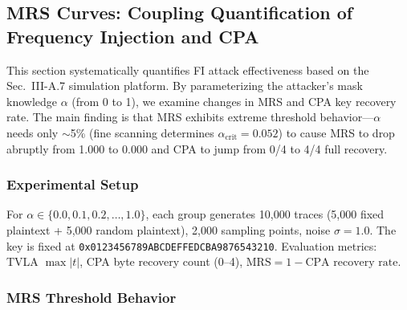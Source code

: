 \documentclass[journal]{IEEEtran}
\begin{document}
\subsection{MRS Curves: Coupling Quantification of Frequency Injection and CPA}

This section systematically quantifies FI attack effectiveness based on the Sec.~III-A.7 simulation platform. By parameterizing the attacker's mask knowledge $\alpha$ (from 0 to 1), we examine changes in MRS and CPA key recovery rate. The main finding is that MRS exhibits extreme threshold behavior---$\alpha$ needs only $\sim$5\% (fine scanning determines $\alpha_{\text{crit}} = 0.052$) to cause MRS to drop abruptly from 1.000 to 0.000 and CPA to jump from 0/4 to 4/4 full recovery.

\subsubsection{Experimental Setup}

For $\alpha \in \{0.0, 0.1, 0.2, \ldots, 1.0\}$, each group generates 10,000 traces (5,000 fixed plaintext + 5,000 random plaintext), 2,000 sampling points, noise $\sigma=1.0$. The key is fixed at \texttt{0x0123456789ABCDEFFEDCBA9876543210}. Evaluation metrics: TVLA $\max|t|$, CPA byte recovery count (0--4), $\text{MRS} = 1 - \text{CPA recovery rate}$.

\subsubsection{MRS Threshold Behavior}

\begin{table}[t]
\renewcommand{\arraystretch}{1.1}
\caption{MRS and CPA Results (Coarse Scan)}
\label{tab:mrs-coarse}
\end{table}
\end{document}
